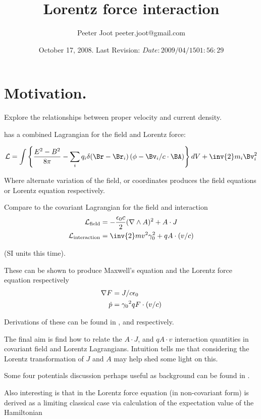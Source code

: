 \documentclass{article}
\title{ Lorentz force interaction } %
\author{Peeter Joot \quad peeter.joot@gmail.com}
\date{ October 17, 2008.  Last Revision: $Date: 2009/04/15 01:56:29 $ }
\begin{document}
\maketitle{}
\tableofcontents

\section{ Motivation.}

Explore the relationships between proper velocity and current density.

\cite{goldstein1951cm} has a combined Lagrangian for the field and Lorentz force:

\begin{align*}
\LL = \int \left\{ \frac{E^2 - B^2}{8 \pi} - \sum_i q_i \delta(\Br-\Br_i)\left(\phi - \Bv_i/c \cdot \BA\right)\right\} dV + \inv{2} m_i \Bv_i^2
\end{align*}

Where alternate variation of the field, or coordinates produces the field equations or Lorentz equation respectively.

Compare to the covariant Lagrangian for the field and interaction
\begin{align}\label{eqn:maxlag}
\LL_{\text{field}} &= -\frac{\epsilon_0 c}{2} (\grad \wedge A)^2 + A \cdot J \\
\LL_{\text{interaction}} &= \inv{2} m v^2 \gamma_0^2 + q A \cdot (v/c)
\end{align}

(SI units this time).

These can be shown to produce Maxwell's equation and the Lorentz force equation respectively
\begin{align}
\nabla F &= J/c\epsilon_0 \\
\dot{p} &= {\gamma_0}^2 q F \cdot (v/c)
\end{align}

Derivations of these can be found in \cite{PJFieldLagrangian}, and \cite{PJSrLorentzForce} respectively.

The final aim is
find how to relate the $A\cdot J$, and $q A \cdot v$ interaction quantities in covariant field and
Lorentz Lagrangians.  Intuition tells me that considering the Lorentz transformation of $J$ and $A$ may help
shed some light on this.

Some four potentials discussion perhaps useful as background can be found in \cite{PJFourPotential}.

Also interesting is that in
\cite{pauli2000wm} the Lorentz force equation (in non-covariant form) is
derived as a limiting classical case via calculation of the expectation
value of the Hamiltonian
\end{document}
